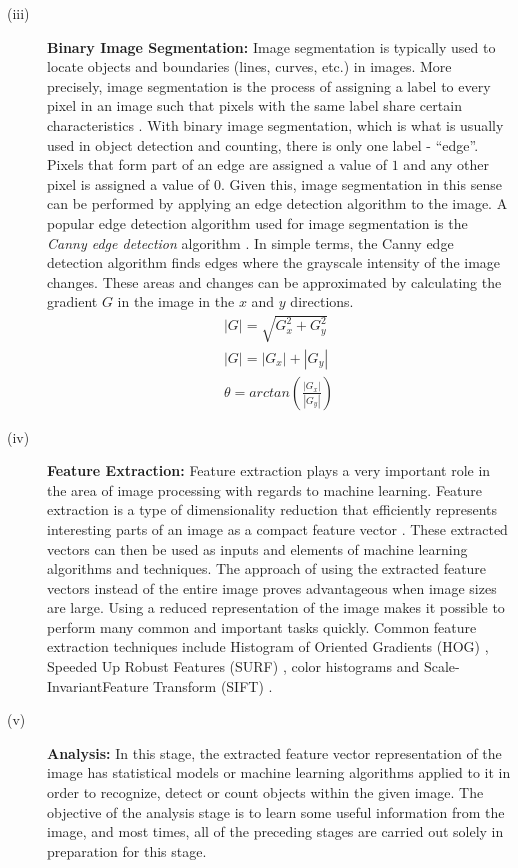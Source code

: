 \begin{description}
\item[(iii)] \textbf{Binary Image Segmentation:} Image segmentation is typically used to locate objects and boundaries (lines, curves, etc.) in images. More precisely, image segmentation is the process of assigning a label to every pixel in an image such that pixels with the same label share certain characteristics \cite{REF7}. With binary image segmentation, which is what is usually used in object detection and counting, there is only one label - ``edge''. Pixels that form part of an edge are assigned a value of $1$ and any other pixel is assigned a value of $0$. Given this, image segmentation in this sense can be performed by applying an edge detection algorithm to the image. A popular edge detection algorithm used for image segmentation is the \textit{Canny edge detection} algorithm \cite{REF8}. In simple terms, the Canny edge detection algorithm finds edges where the grayscale intensity of the image changes. These areas and changes can be approximated by calculating the gradient $G$ in the image in the $x$ and $y$ directions.\\
\begin{align*}
|G| = \sqrt{G_x^2 + G_y^2}\\
|G| = |G_x| + |G_y|\\
\theta = arctan(\frac{|G_x|}{|G_y|}) \tag{2}
\end{align*}

\item[(iv)] \textbf{Feature Extraction:} Feature extraction plays a very important role in the area of image processing with regards to machine learning. Feature extraction is a type of dimensionality reduction that efficiently represents interesting parts of an image as a compact feature vector \cite{REF9}. These extracted vectors can then be used as inputs and elements of machine learning algorithms and techniques. The approach of using the extracted feature vectors instead of the entire image proves advantageous when image sizes are large. Using a reduced representation of the image makes it possible to perform many common and important tasks quickly. Common feature extraction techniques include Histogram of Oriented Gradients (HOG) \cite{REF10}, Speeded Up Robust Features (SURF) \cite{REF11}, color histograms \cite{REF12} and Scale-InvariantFeature Transform (SIFT) \cite{REF13}.\\

\item[(v)] \textbf{Analysis:} In this stage, the extracted feature vector representation of the image has statistical models or machine learning algorithms applied to it in order to recognize, detect or count objects within the given image. The objective of the analysis stage is to learn some useful information from the image, and most times, all of the preceding stages are carried out solely in preparation for this stage.
\end{description}

